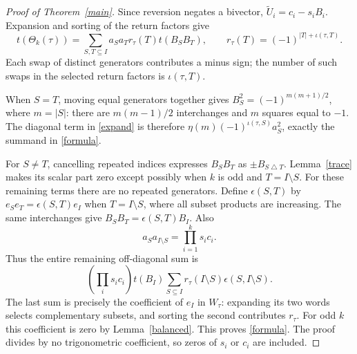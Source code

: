 \documentclass[11pt]{article}
\newcommand{\inv}{\iota}
\begin{document}
\begin{proof}[Proof of Theorem~\ref{main}]
Since reversion negates a bivector, $\widetilde U_i=c_i-s_iB_i$.
Expansion and sorting of the return factors give
\begin{equation}\label{expand}
t(\Theta_k(\tau))=
\sum_{S,T\subseteq I}a_Sa_T r_\tau(T)t(B_SB_T),
\qquad r_\tau(T)=(-1)^{|T|+\inv(\tau,T)}.
\end{equation}
Each swap of distinct generators contributes a minus sign; the number
of such swaps in the selected return factors is $\inv(\tau,T)$.

When $S=T$, moving equal generators together gives
$B_S^2=(-1)^{m(m+1)/2}$, where $m=|S|$: there are $m(m-1)/2$
interchanges and $m$ squares equal to $-1$.
The diagonal term in \eqref{expand} is therefore
$\eta(m)(-1)^{\inv(\tau,S)}a_S^2$, exactly the summand in \eqref{formula}.

For $S\ne T$, cancelling repeated indices expresses $B_SB_T$ as
$\pm B_{S\mathbin\triangle T}$. Lemma~\ref{trace} makes its scalar part
zero except possibly when $k$ is odd and $T=I\setminus S$.
For these remaining terms there are no repeated generators. Define
$\epsilon(S,T)$ by $e_Se_T=\epsilon(S,T)e_I$ when $T=I\setminus S$,
where all subset products are increasing. The same interchanges give
$B_SB_T=\epsilon(S,T)B_I$. Also
\[
a_Sa_{I\setminus S}=\prod_{i=1}^k s_ic_i.
\]
Thus the entire remaining off-diagonal sum is
\begin{equation}\label{correction}
\left(\prod_i s_ic_i\right)t(B_I)
\sum_{S\subseteq I}r_\tau(I\setminus S)\epsilon(S,I\setminus S).
\end{equation}
The last sum is precisely the coefficient of $e_I$ in $W_\tau$:
expanding its two words selects complementary subsets, and sorting the
second contributes $r_\tau$. For odd $k$ this coefficient is zero by
Lemma~\ref{balanced}. This proves \eqref{formula}. The proof divides by
no trigonometric coefficient, so zeros of $s_i$ or $c_i$ are included.
\end{proof}
\end{document}
